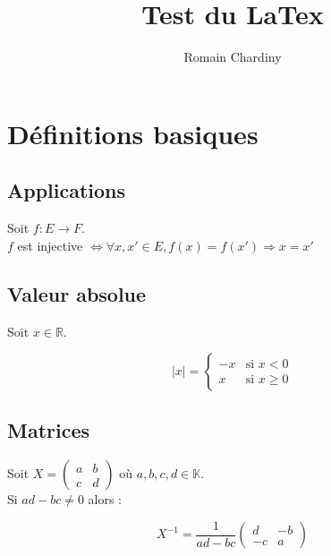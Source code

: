 \documentclass[11pt]{article}
\title{Test du LaTex}
\author{Romain Chardiny}
\begin{document}
	\maketitle
	
	\section{Définitions basiques}
	
	\subsection{Applications}
	
	Soit $f: E \to F $. \\
	$f$ est injective $\Leftrightarrow \forall x,x' \in E, f(x) = f(x') \Rightarrow x = x'$
	
	\subsection{Valeur absolue}
	
	Soit $x \in \mathbb{R}$.
	
	\begin{equation*}
	|x| =
		\begin{cases}
			-x & \text{si } x < 0 \\
			x  & \text{si } x \geq 0
		\end{cases}
	\end{equation*}
	
	\subsection{Matrices}
	
	Soit $X = \begin{pmatrix} 
	a & b \\
	c & d
	\end{pmatrix}$ où $a,b,c,d \in \mathbb{K}$. \\
	Si $ad - bc \ne 0$ alors :
	
	\[
	X^{-1} = \frac{1}{ad - bc} \begin{pmatrix}
	d & -b \\
	-c & a
	\end{pmatrix}
	\]

	
\end{document}
